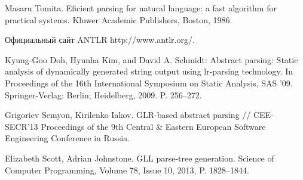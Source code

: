 \documentclass{matmex-diploma-custom}
\begin{document}
\begin{thebibliography}{1}
Masaru Tomita. Eficient parsing for natural language: a fast algorithm for practical systems. Kluwer Academic Publishers, Boston, 1986.

Официальный сайт ANTLR http://www.antlr.org/.

Kyung-Goo Doh, Hyunha Kim, and David A. Schmidt: Abstract parsing: Static analysis of dynamically generated string output using lr-parsing technology. In Proceedings of the 16th International Symposium on Static Analysis, SAS ’09. Springer-Verlag: Berlin; Heidelberg, 2009. P. 256–272.

Grigoriev Semyon, Kirilenko Iakov. GLR-based abstract parsing // CEE-SECR’13 Proceedings of the 9th Central & Eastern European Software Engineering Conference in Russia.

Elizabeth Scott, Adrian Johnstone. GLL parse-tree generation. Science of Computer Programming, Volume 78, Issue 10, 2013, P. 1828–1844.


\end{thebibliography}
\end{document}
